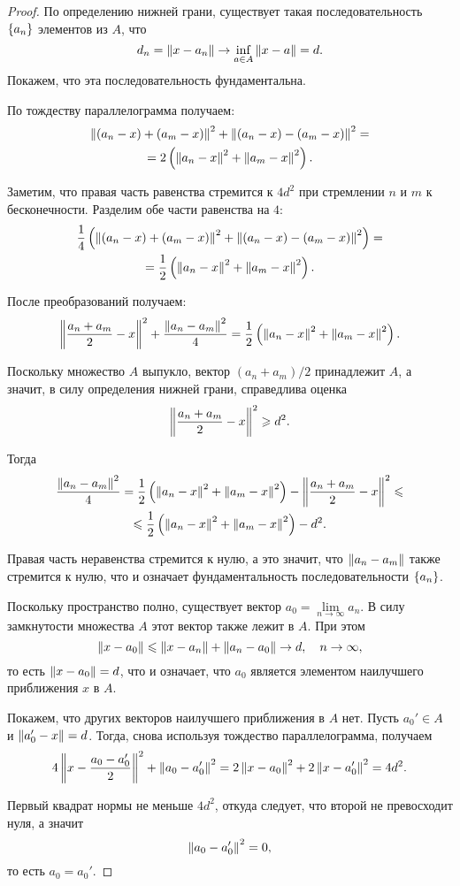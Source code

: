 \begin{proof}
    По определению нижней грани, существует такая последовательность $\left\{a_n\right\}$
    элементов из $A$, что 
    \[d_n = \left\|x - a_n\right\| \to \inf_{a\in A} \left\|x - a\right\| = d.\]
    Покажем, что эта последовательность фундаментальна.

    По тождеству параллелограмма получаем:
    \begin{multline*}
        \left\|(a_n - x) + (a_m - x)\right\|^2 + \left\|(a_n-x)-(a_m-x)\right\|^2 = \\ =
        2\left(\left\|a_n-x\right\|^2+\left\|a_m-x\right\|^2\right). 
    \end{multline*}

    Заметим, что правая часть равенства стремится к $4d^2$ при стремлении $n$ и
    $m$ к бесконечности. Разделим обе части равенства на $4$:
    \begin{multline*}
        \frac{1}{4}\left(\left\|(a_n - x) + (a_m - x)\right\|^2 +
        \left\|(a_n-x)-(a_m-x)\right\|^2\right) = \\ =
        \frac{1}{2}\left(\left\|a_n-x\right\|^2+\left\|a_m-x\right\|^2\right). 
    \end{multline*}

    После преобразований получаем:
    \[
        \left\|\frac{a_n+a_m}{2}-x\right\|^2+\frac{\left\|a_n-a_m\right\|^2}{4} =
        \frac{1}{2}\left(\left\|a_n-x\right\|^2+\left\|a_m-x\right\|^2\right).
    \]

    Поскольку множество $A$ выпукло, вектор $(a_n+a_m)/2$ принадлежит
    $A$, а значит, в силу определения нижней грани, справедлива оценка
    \[ \left\|\frac{a_n+a_m}{2}-x\right\|^2 \geqslant d^2. \]

    Тогда
    \begin{multline*}
        \frac{\left\|a_n-a_m\right\|^2}{4} =
        \frac{1}{2}\left(\left\|a_n-x\right\|^2+\left\|a_m-x\right\|^2\right) -
        \left\|\frac{a_n+a_m}{2}-x\right\|^2 \leqslant \\ \leqslant
        \frac{1}{2}\left(\left\|a_n-x\right\|^2+\left\|a_m-x\right\|^2\right) - d^2.
    \end{multline*}

    Правая часть неравенства стремится к нулю, а это значит, что
    $\left\|a_n-a_m\right\|$ также стремится к нулю, что и означает фундаментальность
    последовательности $\left\{a_n\right\}$.

    Поскольку пространство полно, существует вектор $a_0 =
    \lim\limits_{n\to \infty} a_n$. В силу замкнутости множества $A$ этот вектор также
    лежит в $A$. При этом
    \[ \left\|x-a_0\right\| \leqslant \left\|x-a_n\right\| + \left\|a_n-a_0\right\| \to d, \quad n \to
    \infty, \]
    то есть $\left\|x - a_0\right\| = d$, что и означает, что $a_0$ является элементом
    наилучшего приближения $x$ в $A$.

    Покажем, что других векторов наилучшего приближения в $A$ нет. Пусть $a_0'
    \in A$ и $\left\|a_0' - x\right\| = d$. Тогда, снова используя тождество
    параллелограмма, получаем
    \[ 4 \left\|x - \frac{a_0-a_0'}{2}\right\|^2 + \left\|a_0 - a_0'\right\|^2 = 2 \left\|x -
    a_0\right\|^2 + 2 \left\|x - a_0'\right\|^2 = 4d^2.\]

    Первый квадрат нормы не меньше $4d^2$, откуда следует, что второй не
    превосходит нуля, а значит
    \[ \left\|a_0-a_0'\right\|^2 = 0, \]
    то есть $a_0 = a_0'$.
\end{proof}

